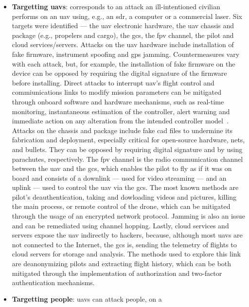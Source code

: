 \begin{itemize}
\item \textbf{Targetting \glspl{uav}}: corresponds to an attack an
  ill-intentioned civilian performs on an \gls{uav} using, e.g., an \gls{sdr}, a
  computer or a commercial laser. Six targets were identified --- the \gls{uav}
  electronic hardware, the \gls{uav} chassis and package (e.g., propelers and
  cargo), the \gls{gcs}, the \gls{fpv} channel, the pilot and cloud
  services/servers. Attacks on the \gls{uav} hardware include installation of
  fake firmware, instrument spoofing and \gls{gps} jamming. Countermeasures vary
  with each attack, but, for example, the installation of fake firmware on the
  device can be opposed by requiring the digital signature of the firmware
  before installing. Direct attacks to interrupt \gls{uav}'s flight control and
  commiunications links to modify mission parameters can be mitigated through
  onboard software and hardware mechanisms, such as real-time monitoring,
  instantaneous estimation of the controller, alert warning and immediate action
  on any alteration from the intended controller model~\cite{mohsan2022towards}.
  Attacks on the chassis and package include fake \gls{cad}
  files to undermine its fabrication and deployment, especially critical for
  open-source hardware, nets, and bullets. They can be opposed by requiring
  digital signature and by using parachutes, respectively.
  The \gls{fpv} channel is the radio communication channel between the \gls{uav}
  and the \gls{gcs}, which enables the pilot to fly as if it was on board and
  consists of a downlink --- used for video streaming --- and an uplink --- used
  to control the \gls{uav} via the \gls{gcs}. The most known methods are
  pilot's deauthentication, taking and dowloading videos and pictures, killing
  the main process, or remote control of the drone, which can be mitigated
  through the usage of an encrypted network protocol. Jamming is also an issue
  and can be remediated using channel hopping. Lastly, cloud services and
  servers expose the \gls{uav} indirectly to hackers, because, although most
  \glspl{uav} are not connected to the Internet, the \gls{gcs} is, sending the
  telemetry of flights to cloud servers for storage and analysis. The methods
  used to explore this link are deanonymizing pilots and extracting flight
  history, which can be both mitigated through the implementation of
  authorization and two-factor authentication mechanisms.
\item \textbf{Targetting people}: \glspl{uav} can attack people, on a

\end{itemize}
